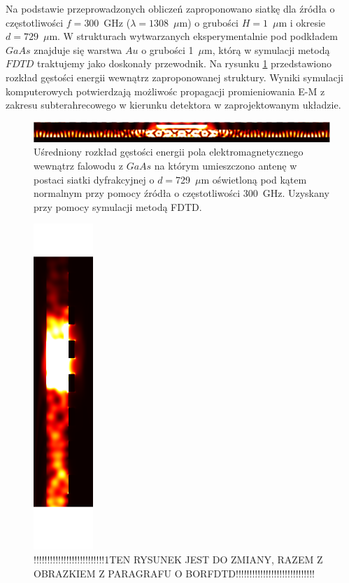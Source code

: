 Na podstawie przeprowadzonych obliczeń zaproponowano siatkę dla źródła o częstotliwości $f=300$~GHz ($\lambda=1308$~$\mu$m) o grubości $H=1$~$\mu$m i okresie $d=729$~$\mu$m. W strukturach wytwarzanych eksperymentalnie pod podkładem $GaAs$ znajduje się warstwa $Au$ o grubości 1~$\mu$m, którą w symulacji metodą $FDTD$ traktujemy jako doskonały przewodnik. Na rysunku \ref{fig:consrc_1d_f300Ghz} przedstawiono rozkład gęstości energii wewnątrz zaproponowanej struktury. Wyniki symulacji komputerowych potwierdzają  możliwośc propagacji promieniowania E-M z zakresu subterahrecowego w kierunku detektora w zaprojektowanym układzie.

\begin{figure}[tb]
	\includegraphics[width=\textwidth]{images/thz/consrc_siatka1d_300GHz_d729um.png}
	\caption{Uśredniony rozkład gęstości energii pola elektromagnetycznego wewnątrz falowodu z $GaAs$ na którym umieszczono antenę w postaci siatki dyfrakcyjnej o $d=$729~$\mu$m oświetloną pod kątem normalnym przy pomocy źródła o częstotliwości 300~GHz. Uzyskany przy pomocy symulacji metodą FDTD. }
	\label{fig:consrc_1d_f300Ghz}
\end{figure}

\begin{figure}
	\includegraphics[width=0.2\textwidth, angle=90]{images/antenaThz/ro_consrc_radial_antena.png}
	\caption{!!!!!!!!!!!!!!!!!!!!!!!!!!1TEN RYSUNEK JEST DO ZMIANY, RAZEM Z OBRAZKIEM Z PARAGRAFU O BORFDTD!!!!!!!!!!!!!!!!!!!!!!!!!!!!!}	
	\label{fig:concent_modfalo}

\end{figure}





